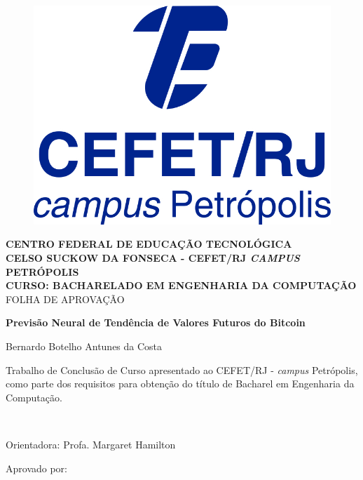 {\center %


\begin{figure}
\center
\includegraphics[height=0.13\textwidth]{Figs/logoCefetCampusPetropolis.jpg} 
\end{figure}

\begin{center}
{\large \bf CENTRO FEDERAL DE EDUCAÇÃO TECNOLÓGICA} \vspace{1mm} \\
{\large \bf CELSO SUCKOW DA FONSECA - CEFET/RJ \textit{CAMPUS} PETRÓPOLIS} \vspace{1mm} \\
{\large \bf CURSO: BACHARELADO EM ENGENHARIA DA COMPUTAÇÃO}\\
\vspace*{1.2cm}
{\large  FOLHA DE APROVAÇÃO}

\vspace*{1.3cm}
{\large \bf  Previsão Neural de Tendência de Valores Futuros do Bitcoin}\\
\end{center}
\vspace{0.5cm}
\hfill
\begin{flushright}
    Bernardo Botelho Antunes da Costa
	\end{flushright}
\vspace*{0.5cm}
\begin{flushright}
	\begin{minipage}{0.5\textwidth}
		{\normalsize
		Trabalho de Conclusão de Curso apresentado ao  
	 CEFET/RJ -{ {\it campus} Petrópolis}, como parte dos requisitos para obtenção do título de Bacharel em Engenharia da Computação.}
	\end{minipage}\\[0.5cm]
\end{flushright}
\vspace{0.5cm}
\hfill
\begin{flushright}
Orientadora: Profa. Margaret Hamilton
\end{flushright}

\begin{minipage}{0.9\textwidth}
	\begin{flushleft}
	Aprovado por:
	\end{flushleft}
\end{minipage}\\[1cm]

}
